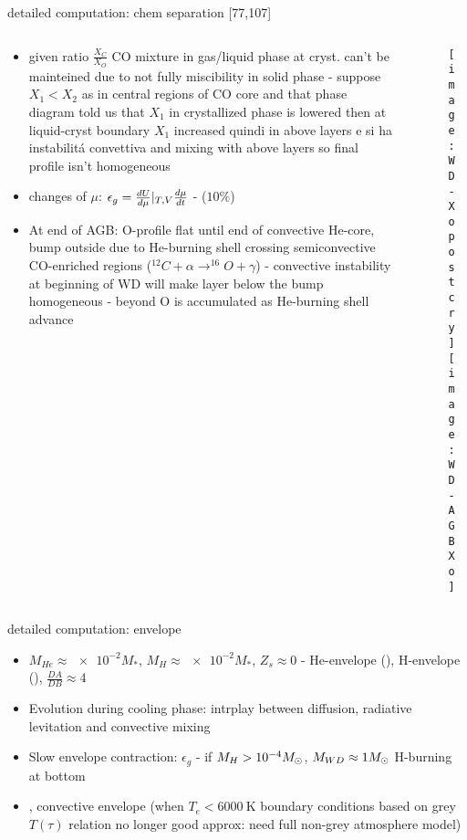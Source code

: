 \begin{frame}{detailed computation: chem separation [77,107]}
\begin{columns}[T]
	\begin{column}{0.65\textwidth}
		\begin{itemize}
			\item given ratio $\frac{X_C}{X_O}$ CO mixture in gas/liquid phase at cryst. can't be mainteined due to not fully miscibility in solid phase - suppose $X_1<X_2$ as in central regions of CO core and that phase diagram told us that $X_1$ in crystallized phase is lowered then at liquid-cryst boundary $X_1$ increased quindi \xdiminuisce{\mu} in above layers e si ha instabilit\'a convettiva and mixing with above layers so final profile isn't homogeneous
			\item changes of $\mu$: $\epsilon_g=\frac{d U}{d \mu}|_{T,V}\frac{d \mu}{d t}$ - ($10\%$)
			\item At end of AGB: O-profile flat until end of convective He-core, bump outside due to He-burning shell crossing semiconvective CO-enriched regions ($^{12}C+\alpha\to^{16}O+\gamma$) - convective instability at beginning of WD will make layer below the bump homogeneous - beyond O is accumulated as He-burning shell advance
		\end{itemize}
	\end{column}
	\begin{column}{0.35\textwidth}
		\begin{figure}[!ht]
		\texttt{[image: WD-Xopostcry]}\label{fig:WD-Xopostcry}
		\texttt{[image: WD-AGBXo]}\label{fig:WD-AGBXo}
		\end{figure}
\end{column}\end{columns}
\end{frame}

\begin{frame}{detailed computation: envelope}
	\begin{itemize}
			\item $M_{He}\approx\num{e-2}M_*$, $M_H\approx\num{e-2}M_*$, $Z_s\approx0$ - He-envelope (), H-envelope (), $\frac{DA}{DB}\approx4$
			\item Evolution during cooling phase: intrplay between diffusion, radiative levitation and convective mixing
			\item Slow envelope contraction: $\epsilon_g$ - if $M_H>\num{e-4}M_{\odot}$, $M_{WD}\approx1M_{\odot}$ H-burning at bottom
			\item {}, convective envelope (when $T_e<\SI{6000}{\kelvin}$ boundary conditions based on grey $T(\tau)$ relation no longer good approx: need full non-grey atmosphere model)
	\end{itemize}
\end{frame}

